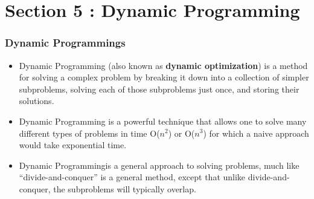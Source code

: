 \documentclass[algocomplexity.tex]{subfiles}
\begin{document}
\section{Section 5 : Dynamic Programming}
\begin{frame}
	
	
	\frametitle{Dynamic Programmings}
	\begin{itemize}
		\item Dynamic Programming (also known as \textbf{dynamic optimization}) is a method for solving a complex problem by breaking it down into a collection of simpler subproblems, solving each of those subproblems just once, and storing their solutions.
		
		\item Dynamic Programming is a powerful technique that allows one to solve many different types of
		problems in time O($n^2$) or O($n^3$) for which a naive approach would take exponential time. 
		
		\item Dynamic Programmingis a general approach to solving problems, much like “divide-and-conquer” is a general
		method, except that unlike divide-and-conquer, the subproblems will typically overlap.
	\end{itemize}
\end{frame}
	
\end{document}
